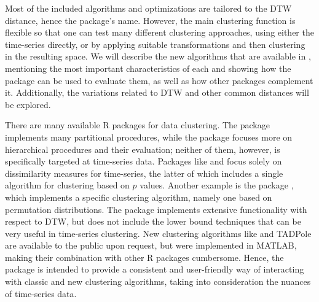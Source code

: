 Most of the included algorithms and optimizations are tailored to the DTW distance, hence the package's name.
However, the main clustering function is flexible so that one can test many different clustering approaches,
using either the time-series directly,
or by applying suitable transformations and then clustering in the resulting space.
We will describe the new algorithms that are available in \dtwclust{},
mentioning the most important characteristics of each and showing how the package can be used to evaluate them,
as well as how other packages complement it.
Additionally, the variations related to DTW and other common distances will be explored.

There are many available R packages for data clustering.
The  package \citep{leisch2006} implements many partitional procedures,
while the  package \citep{cluster} focuses more on hierarchical procedures and their evaluation;
neither of them, however, is specifically targeted at time-series data.
Packages like  \citep{tsdist} and  \citep{montero2014} focus solely on dissimilarity measures for time-series,
the latter of which includes a single algorithm for clustering based on $p$ values.
Another example is the  package \citep{brandmaier2015},
which implements a specific clustering algorithm,
namely one based on permutation distributions.
The  package \citep{giorgino2009} implements extensive functionality with respect to DTW,
but does not include the lower bound techniques that can be very useful in time-series clustering.
New clustering algorithms like \kshape{} \citep{paparrizos2015} and TADPole \citep{begum2015} are available to the public upon request,
but were implemented in MATLAB, 
making their combination with other R packages cumbersome.
Hence, the \dtwclust{} package is intended to provide a consistent and user-friendly way of interacting with classic and new clustering algorithms,
taking into consideration the nuances of time-series data.

